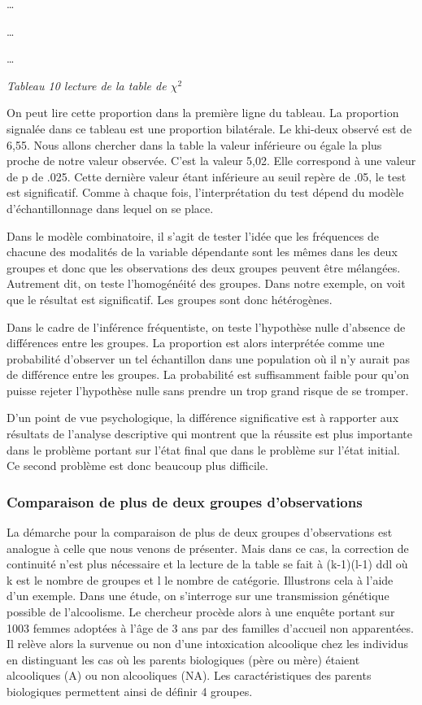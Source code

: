 \documentclass[]{book}
\theoremstyle{definition}
\theoremstyle{definition}
\theoremstyle{definition}
\theoremstyle{remark}
\begin{document}
\ldots{}

\ldots{}

\ldots{}

\emph{Tableau 10 lecture de la table de \(\chi ^{2}\)}

On peut lire cette proportion dans la première ligne du tableau. La
proportion signalée dans ce tableau est une proportion bilatérale. Le
khi-deux observé est de 6,55. Nous allons chercher dans la table la
valeur inférieure ou égale la plus proche de notre valeur observée.
C'est la valeur 5,02. Elle correspond à une valeur de p de .025. Cette
dernière valeur étant inférieure au seuil repère de .05, le test est
significatif. Comme à chaque fois, l'interprétation du test dépend du
modèle d'échantillonnage dans lequel on se place.

Dans le modèle combinatoire, il s'agit de tester l'idée que les
fréquences de chacune des modalités de la variable dépendante sont les
mêmes dans les deux groupes et donc que les observations des deux
groupes peuvent être mélangées. Autrement dit, on teste l'homogénéité
des groupes. Dans notre exemple, on voit que le résultat est
significatif. Les groupes sont donc hétérogènes.

Dans le cadre de l'inférence fréquentiste, on teste l'hypothèse nulle
d'absence de différences entre les groupes. La proportion est alors
interprétée comme une probabilité d'observer un tel échantillon dans une
population où il n'y aurait pas de différence entre les groupes. La
probabilité est suffisamment faible pour qu'on puisse rejeter
l'hypothèse nulle sans prendre un trop grand risque de se tromper.

D'un point de vue psychologique, la différence significative est à
rapporter aux résultats de l'analyse descriptive qui montrent que la
réussite est plus importante dans le problème portant sur l'état final
que dans le problème sur l'état initial. Ce second problème est donc
beaucoup plus difficile.

\hypertarget{comparaison-de-plus-de-deux-groupes-dobservations}{%
\subsubsection{Comparaison de plus de deux groupes
d'observations}\label{comparaison-de-plus-de-deux-groupes-dobservations}}

La démarche pour la comparaison de plus de deux groupes d'observations
est analogue à celle que nous venons de présenter. Mais dans ce cas, la
correction de continuité n'est plus nécessaire et la lecture de la table
se fait à (k-1)(l-1) ddl où k est le nombre de groupes et l le nombre de
catégorie. Illustrons cela à l'aide d'un exemple. Dans une étude, on
s'interroge sur une transmission génétique possible de l'alcoolisme. Le
chercheur procède alors à une enquête portant sur 1003 femmes adoptées à
l'âge de 3 ans par des familles d'accueil non apparentées. Il relève
alors la survenue ou non d'une intoxication alcoolique chez les
individus en distinguant les cas où les parents biologiques (père ou
mère) étaient alcooliques (A) ou non alcooliques (NA). Les
caractéristiques des parents biologiques permettent ainsi de définir 4
groupes.
\end{document}
